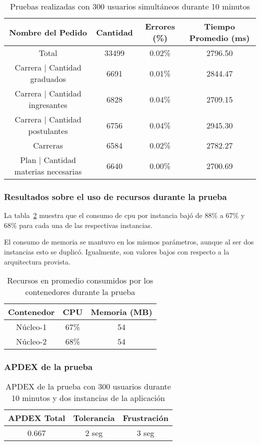 \begin{table}[!htbp]
    \centering
    \makegapedcells
    \begin{tabular}{|c|c|c|c|}
    \hline
    Nombre del Pedido & Cantidad & Errores (\%) & Tiempo Promedio (ms) \\ \hline
    Total & 33499 & 0.02\% & 2796.50\\ \hline
    Carrera | Cantidad graduados & 6691 & 0.01\% & 2844.47\\ \hline
    Carrera | Cantidad ingresantes & 6828 & 0.04\% & 2709.15\\ \hline
    Carrera | Cantidad postulantes & 6756 & 0.04\% & 2945.30\\ \hline
    Carreras & 6584 & 0.02\% & 2782.27\\ \hline
    Plan | Cantidad materias necesarias & 6640 & 0.00\% & 2700.69\\ \hline
    \end{tabular}
    \caption{Pruebas realizadas con 300 usuarios simultáneos durante 10 minutos}
    \label{tab:300u_10m_2i_gen}
\end{table}



\subsubsection{Resultados sobre el uso de recursos durante la prueba}

La tabla~\ref{tab:300u_10m_2i_rec} muestra que el consumo de cpu por instancia bajó de 88\% a 67\% y 68\% para cada una de las respectivas instancias. 

El consumo de memoria se mantuvo en los mismos parámetros, aunque al ser dos instancias esto se duplicó. Igualmente, son valores bajos con respecto a la arquitectura provista.
\begin{table}[!htbp]
    \centering
    \makegapedcells
    \begin{tabular}{|c|c|c|}
    \hline
    Contenedor & CPU & Memoria (MB)\\ \hline
    Núcleo-1 & 67\% & 54 \\ \hline
    Núcleo-2 & 68\% & 54 \\ \hline
    \end{tabular}
    \caption{Recursos en promedio consumidos por los contenedores durante la prueba}
    \label{tab:300u_10m_2i_rec}
\end{table}
\subsubsection{APDEX de la prueba}
\begin{table}[!htbp]
    \centering
    \makegapedcells
    \begin{tabular}{|c|c|c|}
    \hline
    APDEX Total & Tolerancia & Frustración\\ \hline
    0.667 & 2 seg & 3 seg \\ \hline
    \end{tabular}
    \caption{APDEX de la prueba con 300 usuarios durante 10 minutos y dos instancias de la aplicación}
    \label{tab:300u_10m_2i_apdex}
\end{table}
\break
